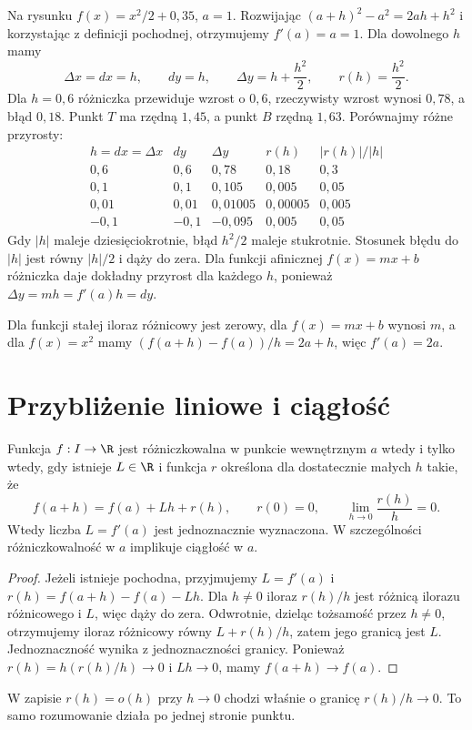 \begin{przyklad}
\label{ma1:ex:differential-quadratic}
Na rysunku $f(x)=x^2/2+0{,}35$, $a=1$. Rozwijając $(a+h)^2-a^2=2ah+h^2$ i korzystając z definicji pochodnej, otrzymujemy $f'(a)=a=1$. Dla dowolnego $h$ mamy
\[
 \Delta x=dx=h,\qquad dy=h,\qquad
 \Delta y=h+\frac{h^2}{2},\qquad r(h)=\frac{h^2}{2}.
\]
Dla $h=0{,}6$ różniczka przewiduje wzrost o $0{,}6$, rzeczywisty wzrost wynosi $0{,}78$, a błąd $0{,}18$. Punkt $T$ ma rzędną $1{,}45$, a punkt $B$ rzędną $1{,}63$. Porównajmy różne przyrosty:
\[
\begin{array}{r|r|r|r|r}
 h=dx=\Delta x &dy&\Delta y&r(h)&|r(h)|/|h|\\ \hline
 0{,}6&0{,}6&0{,}78&0{,}18&0{,}3\\
 0{,}1&0{,}1&0{,}105&0{,}005&0{,}05\\
 0{,}01&0{,}01&0{,}01005&0{,}00005&0{,}005\\
 -0{,}1&-0{,}1&-0{,}095&0{,}005&0{,}05
\end{array}
\]
Gdy $|h|$ maleje dziesięciokrotnie, błąd $h^2/2$ maleje stukrotnie. Stosunek błędu do $|h|$ jest równy $|h|/2$ i dąży do zera. Dla funkcji afinicznej $f(x)=mx+b$ różniczka daje dokładny przyrost dla każdego $h$, ponieważ $\Delta y=mh=f'(a)h=dy$.
\end{przyklad}

\begin{przyklad}
\label{ma1:ex:derivative-basic}
Dla funkcji stałej iloraz różnicowy jest zerowy, dla $f(x)=mx+b$ wynosi $m$, a dla $f(x)=x^2$ mamy $(f(a+h)-f(a))/h=2a+h$, więc $f'(a)=2a$.
\end{przyklad}

\section{Przybliżenie liniowe i ciągłość}
\begin{twierdzenie}
\label{ma1:thm:linear-approximation}
Funkcja $f:I\to\R$ jest różniczkowalna w punkcie wewnętrznym $a$ wtedy i tylko wtedy, gdy istnieje $L\in\R$ i funkcja $r$ określona dla dostatecznie małych $h$ takie, że
\[
 f(a+h)=f(a)+Lh+r(h),\qquad r(0)=0,\qquad
 \lim_{h\to0}\frac{r(h)}h=0.
\]
Wtedy liczba $L=f'(a)$ jest jednoznacznie wyznaczona. W szczególności różniczkowalność w $a$ implikuje ciągłość w $a$.
\end{twierdzenie}
\begin{proof}
Jeżeli istnieje pochodna, przyjmujemy $L=f'(a)$ i $r(h)=f(a+h)-f(a)-Lh$. Dla $h\ne0$ iloraz $r(h)/h$ jest różnicą ilorazu różnicowego i $L$, więc dąży do zera. Odwrotnie, dzieląc tożsamość przez $h\ne0$, otrzymujemy iloraz różnicowy równy $L+r(h)/h$, zatem jego granicą jest $L$. Jednoznaczność wynika z jednoznaczności granicy. Ponieważ $r(h)=h(r(h)/h)\to0$ i $Lh\to0$, mamy $f(a+h)\to f(a)$.
\end{proof}
W zapisie $r(h)=o(h)$ przy $h\to0$ chodzi właśnie o granicę $r(h)/h\to0$. To samo rozumowanie działa po jednej stronie punktu.

